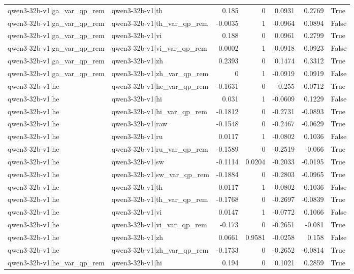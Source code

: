 \begin{table}
\begin{tabular}{l l r r r r l}
qwen3-32b-v1|ga_var_qp_rem & qwen3-32b-v1|th & 0.185 & 0 & 0.0931 & 0.2769 & True \\
qwen3-32b-v1|ga_var_qp_rem & qwen3-32b-v1|th_var_qp_rem & -0.0035 & 1 & -0.0964 & 0.0894 & False \\
qwen3-32b-v1|ga_var_qp_rem & qwen3-32b-v1|vi & 0.188 & 0 & 0.0961 & 0.2799 & True \\
qwen3-32b-v1|ga_var_qp_rem & qwen3-32b-v1|vi_var_qp_rem & 0.0002 & 1 & -0.0918 & 0.0923 & False \\
qwen3-32b-v1|ga_var_qp_rem & qwen3-32b-v1|zh & 0.2393 & 0 & 0.1474 & 0.3312 & True \\
qwen3-32b-v1|ga_var_qp_rem & qwen3-32b-v1|zh_var_qp_rem & 0 & 1 & -0.0919 & 0.0919 & False \\
qwen3-32b-v1|he & qwen3-32b-v1|he_var_qp_rem & -0.1631 & 0 & -0.255 & -0.0712 & True \\
qwen3-32b-v1|he & qwen3-32b-v1|hi & 0.031 & 1 & -0.0609 & 0.1229 & False \\
qwen3-32b-v1|he & qwen3-32b-v1|hi_var_qp_rem & -0.1812 & 0 & -0.2731 & -0.0893 & True \\
qwen3-32b-v1|he & qwen3-32b-v1|raw & -0.1548 & 0 & -0.2467 & -0.0629 & True \\
qwen3-32b-v1|he & qwen3-32b-v1|ru & 0.0117 & 1 & -0.0802 & 0.1036 & False \\
qwen3-32b-v1|he & qwen3-32b-v1|ru_var_qp_rem & -0.1589 & 0 & -0.2519 & -0.066 & True \\
qwen3-32b-v1|he & qwen3-32b-v1|sw & -0.1114 & 0.0204 & -0.2033 & -0.0195 & True \\
qwen3-32b-v1|he & qwen3-32b-v1|sw_var_qp_rem & -0.1884 & 0 & -0.2803 & -0.0965 & True \\
qwen3-32b-v1|he & qwen3-32b-v1|th & 0.0117 & 1 & -0.0802 & 0.1036 & False \\
qwen3-32b-v1|he & qwen3-32b-v1|th_var_qp_rem & -0.1768 & 0 & -0.2697 & -0.0839 & True \\
qwen3-32b-v1|he & qwen3-32b-v1|vi & 0.0147 & 1 & -0.0772 & 0.1066 & False \\
qwen3-32b-v1|he & qwen3-32b-v1|vi_var_qp_rem & -0.173 & 0 & -0.2651 & -0.081 & True \\
qwen3-32b-v1|he & qwen3-32b-v1|zh & 0.0661 & 0.9581 & -0.0258 & 0.158 & False \\
qwen3-32b-v1|he & qwen3-32b-v1|zh_var_qp_rem & -0.1733 & 0 & -0.2652 & -0.0814 & True \\
qwen3-32b-v1|he_var_qp_rem & qwen3-32b-v1|hi & 0.194 & 0 & 0.1021 & 0.2859 & True \\

\end{tabular}
\end{table}
